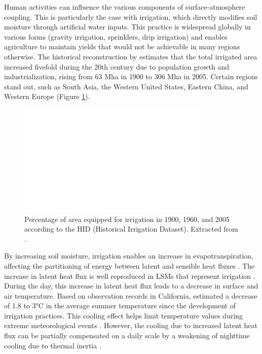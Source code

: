 Human activities can influence the various components of surface-atmosphere coupling. This is particularly the case with irrigation, which directly modifies soil moisture through artificial water inputs. This practice is widespread globally in various forms (gravity irrigation, sprinklers, drip irrigation) and enables agriculture to maintain yields that would not be achievable in many regions otherwise. The historical reconstruction by \cite{siebert_global_2015} estimates that the total irrigated area increased fivefold during the 20th century due to population growth and industrialization, rising from 63 Mha in 1900 to 306 Mha in 2005. Certain regions stand out, such as South Asia, the Western United States, Eastern China, and Western Europe (Figure \ref{irrig_evolution_map}).

\begin{figure}[ht]
    \centering
    \includegraphics[width=\textwidth]{images/irrig_evolution_Siebert.png}
    \caption{Percentage of area equipped for irrigation in 1900, 1960, and 2005 according to the HID (Historical Irrigation Dataset). Extracted from \cite{siebert_global_2015}.}
    \label{irrig_evolution_map}
\end{figure}

By increasing soil moisture, irrigation enables an increase in evapotranspiration, affecting the partitioning of energy between latent and sensible heat fluxes \cite{pokhrel_incorporating_2012}. The increase in latent heat flux is well reproduced in LSMs that represent irrigation \cite{pokhrel_incorporating_2012, arboleda-obando_validation_2024, al-yaari_role_2022}. During the day, this increase in latent heat flux leads to a decrease in surface and air temperature. Based on observation records in California, \cite{bonfils_empirical_2007} estimated a decrease of 1.8 to 3°C in the average summer temperature since the development of irrigation practices. This cooling effect helps limit temperature values during extreme meteorological events \citep{thiery_present-day_2017, thiery_warming_2020}. However, the cooling due to increased latent heat flux can be partially compensated on a daily scale by a weakening of nighttime cooling due to thermal inertia \citep{chen_irrigation_2018}.

